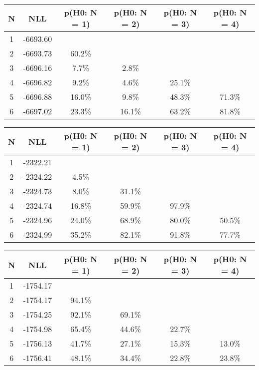 \begin{table}[htb]
	\begin{center}
{\footnotesize\renewcommand{\arraystretch}{1.4}
		\begin{tabular}{cc||cccc}
			N & NLL & p(H0: N = 1) & p(H0: N = 2) & p(H0: N = 3) & p(H0: N = 4)\\ 
		\hline
1 & -6693.60 & & & & \\
2 & -6693.73 & 60.2\% & & & \\
3 & -6696.16 & 7.7\% & 2.8\% & & \\
4 & -6696.82 & 9.2\% & 4.6\% & 25.1\% & \\
5 & -6696.88 & 16.0\% & 9.8\% & 48.3\% & 71.3\% \\
6 & -6697.02 & 23.3\% & 16.1\% & 63.2\% & 81.8\% \\
	\end{tabular}
		\label{tab:lab}
	}
	\end{center}\end{table}

\begin{table}[htb]
	\begin{center}
{\footnotesize\renewcommand{\arraystretch}{1.4}
		\begin{tabular}{cc||cccc}
			N & NLL & p(H0: N = 1) & p(H0: N = 2) & p(H0: N = 3) & p(H0: N = 4)\\ 
		\hline
1 & -2322.21 & & & & \\
2 & -2324.22 & 4.5\% & & & \\
3 & -2324.73 & 8.0\% & 31.1\% & & \\
4 & -2324.74 & 16.8\% & 59.9\% & 97.9\% & \\
5 & -2324.96 & 24.0\% & 68.9\% & 80.0\% & 50.5\% \\
6 & -2324.99 & 35.2\% & 82.1\% & 91.8\% & 77.7\% \\
	\end{tabular}
		\label{tab:lab}
	}
	\end{center}\end{table}

\begin{table}[htb]
	\begin{center}
{\footnotesize\renewcommand{\arraystretch}{1.4}
		\begin{tabular}{cc||cccc}
			N & NLL & p(H0: N = 1) & p(H0: N = 2) & p(H0: N = 3) & p(H0: N = 4)\\ 
		\hline
1 & -1754.17 & & & & \\
2 & -1754.17 & 94.1\% & & & \\
3 & -1754.25 & 92.1\% & 69.1\% & & \\
4 & -1754.98 & 65.4\% & 44.6\% & 22.7\% & \\
5 & -1756.13 & 41.7\% & 27.1\% & 15.3\% & 13.0\% \\
6 & -1756.41 & 48.1\% & 34.4\% & 22.8\% & 23.8\% \\
	\end{tabular}
		\label{tab:lab}
	}
	\end{center}\end{table}

